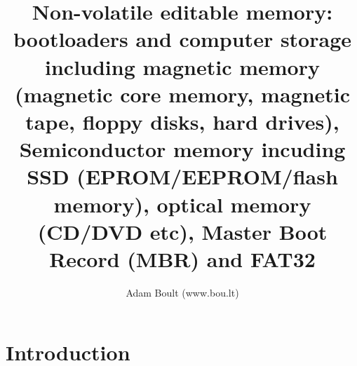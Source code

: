 \documentclass[oneside]{book}
\begin{document}
\author{Adam Boult (www.bou.lt)}
\title{Non-volatile editable memory: bootloaders and computer storage including magnetic memory (magnetic core memory, magnetic tape, floppy disks, hard drives), Semiconductor memory incuding SSD (EPROM/EEPROM/flash memory), optical memory (CD/DVD etc), Master Boot Record (MBR) and FAT32}
\maketitle

\setcounter{tocdepth}{0}
\tableofcontents



\part{Introduction}




\end{document}
